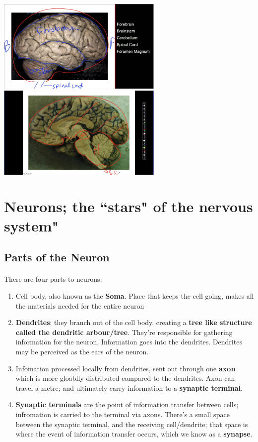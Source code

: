 \documentclass[12pt, a4paper]{article}
\begin{document}
{
    \centering
    \includegraphics[width=8cm]{BrainImg_FromSide_SidesAnnotated.png}
    \includegraphics[width=8cm]{BrainImg_CutFromSide_MidHindBrainStem.png}

}
\newpage

\section{Neurons; the ``stars" of the nervous system"}

\subsection{Parts of the Neuron}
\paragraph*{}
There are four parts to neurons.
\begin{enumerate}
    \item Cell body, also known as the \textbf{Soma}. Place that keeps the cell going,
    makes all the materials needed for the entire neuron
    \item \textbf{Dendrites}; they branch out of the cell body, creating a \textbf{tree like structure
    called the dendritic arbour/tree}. They're responsible for gathering information for the neuron. Information 
    goes into the dendrites. Dendrites may be perceived as the ears of the neuron.
    \item Infomation processed locally from dendrites, sent out through one \textbf{axon} which is more gloablly distributed
    compared to the dendrites. Axon can travel a metre; and ultimately carry information to a \textbf{synaptic terminal}.
    \item \textbf{Synaptic terminals} are the point of information transfer between cells; infromation is carried to the terminal
    via axons. There's a small space between the synaptic terminal, and the receiving cell/dendrite; that space is where the
    event of information transfer occurs, which we know as a \textbf{synapse}.
\end{enumerate}
\end{document}
